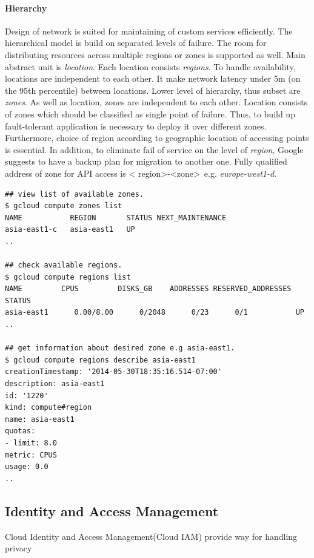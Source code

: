 \documentclass[a4paper,12pt,oneside]{report}
\begin{document}
	\paragraph*{Hierarchy}
	Design of network is suited for maintaining  of custom services efficiently. The
	hierarchical model is build on separated
	levels of failure.  The room for distributing resources across multiple regions
	or zones is supported as well. Main abstract unit is \textit{location}. Each
	location consists \textit{regions}. To handle availability, locations are
	independent to each other. It make  
	network latency under 5m (on the 95th percentile) between locations. Lower
	level of hierarchy, thus subset are \textit{zones}. As well as location, 
	zones are independent to each other. Location consists of zones which should be
	classified as single point of failure. Thus, 
	to build up fault-tolerant application is necessary to deploy it over different
	zones. Furthermore, choice of region according 
	to geographic location of accessing points is essential. In addition, to
	eliminate fail of service on the level of \textit{region}, 
	Google suggests to have a backup plan for migration to another one. Fully
	qualified address of zone   for API access is \textless 
	region\textgreater-\textless zone\textgreater \ e.g. \textit{europe-west1-d}. 
	
	
	\begin{footnotesize}
		\begin{lstlisting}[style=mybash]
## view list of available zones.
$ gcloud compute zones list
NAME           REGION       STATUS NEXT_MAINTENANCE 
asia-east1-c   asia-east1   UP
..

## check available regions.
$ gcloud compute regions list
NAME         CPUS         DISKS_GB    ADDRESSES RESERVED_ADDRESSES STATUS 
asia-east1      0.00/8.00      0/2048      0/23      0/1           UP
..

## get information about desired zone e.g asia-east1.
$ gcloud compute regions describe asia-east1
creationTimestamp: '2014-05-30T18:35:16.514-07:00'
description: asia-east1
id: '1220'
kind: compute#region
name: asia-east1
quotas:
- limit: 8.0
metric: CPUS
usage: 0.0
..
		\end{lstlisting}\end{footnotesize}
	
	
	
	
	
	\subsection{Identity and Access Management}
	Cloud Identity and Access Management(Cloud IAM) provide way for handling privacy
	
\end{document}

